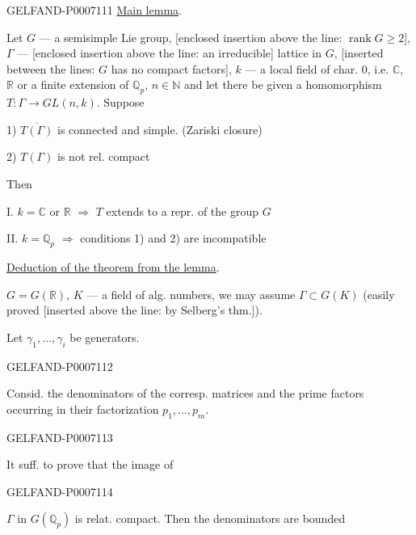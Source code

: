 \begin{GelfandAdjacentEvidence}{GELFAND-P000711}{1}
\underline{Main lemma}.

Let \(G\) --- a semisimple Lie group,
[enclosed insertion above the line: \(\operatorname{rank}G\ge 2\)],
\(\Gamma\) --- [enclosed insertion above the line: an irreducible] lattice in \(G\),
[inserted between the lines: \(G\) has no compact factors],
\(k\) --- a local field of char. \(0\), i.e. \(\mathbb C\), \(\mathbb R\) or a finite extension of
\(\mathbb Q_p\), \(n\in\mathbb N\) and let there be given a homomorphism
\(T:\Gamma\longrightarrow GL(n,k)\). Suppose

1) \(\overline{T(\Gamma)}\) is connected and simple.
(Zariski closure)

2) \(T(\Gamma)\) is not rel. compact

Then

I. \(k=\mathbb C\) or \(\mathbb R\)
\(\Rightarrow\) \(T\) extends to a repr. of the group \(G\)

II. \(k=\mathbb Q_p\) \(\Rightarrow\) conditions 1) and 2) are incompatible

\underline{Deduction of the theorem from the lemma}.

\(G=G(\mathbb R)\), \(K\) --- a field of alg. numbers,
we may assume \(\Gamma\subset G(K)\)
(easily proved [inserted above the line: by Selberg’s thm.]).

Let
\(\gamma_1,\ldots,\gamma_i\) be generators.
\end{GelfandAdjacentEvidence}
\begin{GelfandAdjacentEvidence}{GELFAND-P000711}{2}

Consid. the denominators of the corresp. matrices and the prime factors occurring in their factorization \(p_1,\ldots,p_m\).
\end{GelfandAdjacentEvidence}
\begin{GelfandAdjacentEvidence}{GELFAND-P000711}{3}


It suff. to prove that the image of
\end{GelfandAdjacentEvidence}
\begin{GelfandAdjacentEvidence}{GELFAND-P000711}{4}

\(\Gamma\) in \(G(\mathbb Q_p)\) is relat. compact.
Then the denominators are bounded
\end{GelfandAdjacentEvidence}

